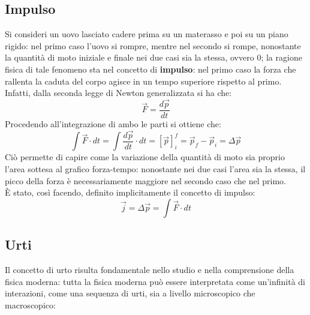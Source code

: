 \documentclass[a4paper]{extarticle}
\begin{document}
\subsection{Impulso}
Si consideri un uovo lasciato cadere prima su un materasso e poi su un piano rigido: nel primo caso l'uovo si rompre, mentre nel secondo si rompe, nonostante la quantità di moto iniziale e finale nei due casi sia la stessa, ovvero $0$; la ragione fisica di tale fenomeno sta nel concetto di \textbf{impulso}: nel primo caso la forza che rallenta la caduta del corpo agisce in un tempo superiore rispetto al primo.\\
Infatti, dalla seconda legge di Newton generalizzata si ha che:
\[\vec F = \frac{d \vec p}{dt}\]
Procedendo all'integrazione di ambo le parti si ottiene che:
\[\int \vec F \cdot dt = \int \frac{d \vec p}{dt} \cdot dt = \left[\vec p\right]_i^f = \vec p_f - \vec p_i = \Delta \vec p\]
Ciò permette di capire come la variazione della quantità di moto sia proprio l'area sottesa al grafico forza-tempo: nonostante nei due casi l'area sia la stessa, il picco della forza è necessariamente maggiore nel secondo caso che nel primo.\\
È stato, così facendo, definito implicitamente il concetto di impulso:
\[\boxed{\vec j = \Delta \vec p = \int \vec F \cdot dt}\]

\vspace{1em}
\subsection{Urti}
Il concetto di urto risulta fondamentale nello studio e nella comprensione della fisica moderna: tutta la fisica moderna può essere interpretata come un'infinità di interazioni, come una sequenza di urti, sia a livello microscopico che macroscopico:
\end{document}
